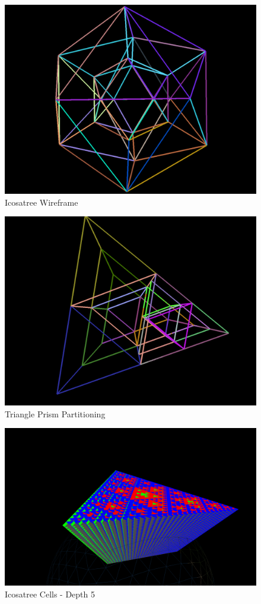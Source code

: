 \begin{figure}[htp]
\begin{center}
  \includegraphics[width=.75\linewidth]{images/trianglePrismBounds.png}
  \caption{Icosatree Wireframe}
  \label{fig:tpv}
\end{center}
\end{figure}

\begin{figure}[htp]
\begin{center}
  \includegraphics[width=.75\linewidth]{images/trianglePrismBoundsSplit.png}
  \caption{Triangle Prism Partitioning}
  \label{fig:tpvSplit}
\end{center}
\end{figure}

\begin{figure}[htp]
\begin{center}
  \includegraphics[width=.9\linewidth]{images/treeStructure_depth5.png}
  \caption{Icosatree Cells - Depth 5}
  \label{fig:icosatreeCells}
\end{center}
\end{figure}

